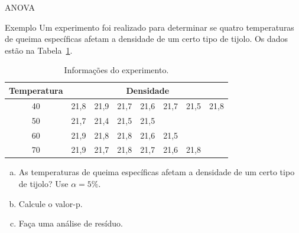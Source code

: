 \documentclass[8pt]{beamer}
\begin{document}
\begin{frame}{ANOVA}
\begin{block}{Exemplo}
	Um experimento foi realizado para determinar se quatro temperaturas de queima específicas afetam a densidade de um certo tipo de tijolo. Os dados estão na Tabela~\ref{tab:anova-unbalanced}.
	\begin{table}[htbp]
		\centering
		\begin{tabular}{c|ccccccc}
			\toprule[0.05cm]
			Temperatura & \multicolumn{7}{|c}{Densidade}\\ \midrule[0.025cm]
			40  &  21,8 & 21,9 & 21,7 & 21,6 & 21,7 &  21,5 & 21,8\\
			50  & 21,7 &	21,4 & 21,5 & 21,5 &  &  &  \\
			60  & 21,9 &	21,8 & 21,8 & 21,6 & 21,5 &  & \\
			70  & 21,9 &	21,7 & 21,8 & 21,7 & 21,6 & 21,8 &\\
			\bottomrule[0.05cm]
		\end{tabular}
		\caption{Informações do experimento.}
		\label{tab:anova-unbalanced}
	\end{table}
	\begin{enumerate}[(a)]
		\item As temperaturas de queima específicas afetam a densidade de um certo tipo de tijolo? Use $\alpha=5\%$. 
		\item Calcule o valor-p.
		\item Faça uma análise de resíduo.
	\end{enumerate}
\end{block}
\end{frame}
\end{document}

